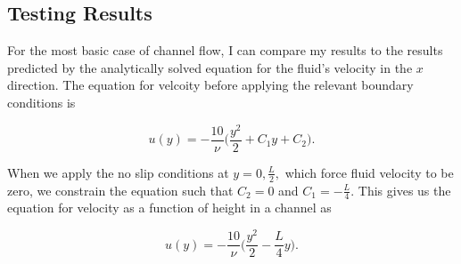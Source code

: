\documentclass[11pt]{article}
\begin{document}
    \subsection{Testing Results}\label{testing-results}

For the most basic case of channel flow, I can compare my results to the
results predicted by the analytically solved equation for the fluid's
velocity in the \(x\) direction. The equation for velcoity before
applying the relevant boundary conditions is

\[u(y) = -\frac{10}{\nu}\biggr(\frac{y^2}{2} + C_1y + C_2\biggr).\]

When we apply the no slip conditions at \(y=0,\tfrac L2,\) which force
fluid velocity to be zero, we constrain the equation such that
\(C_2 = 0\) and \(C_1 = -\frac L4.\) This gives us the equation for
velocity as a function of height in a channel as

\begin{equation}
u(y) = -\frac{10}{\nu}\biggr(\frac{y^2}{2} -\frac L4 y\biggr).
\end{equation}
\end{document}
